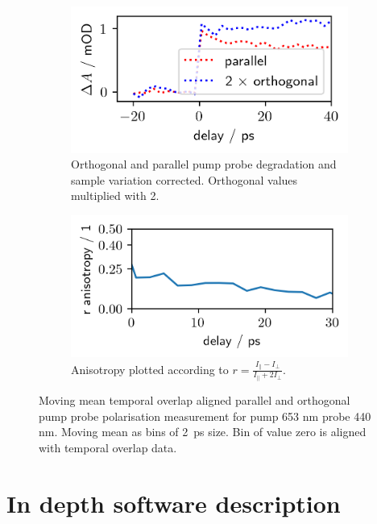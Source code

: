 \documentclass[twoside,openright]{scrreprt}
\begin{document}
\begin{figure}[hbt]
\centering
\begin{subfigure}[t]{0.49\linewidth}
\includegraphics[scale=1]{images/440nm_ParallelOrthComparison.png}
\caption{Orthogonal and parallel pump probe degradation and sample variation corrected. Orthogonal values multiplied with 2.\label{fig:polarisationComp}}
\end{subfigure}
\hfill
\begin{subfigure}[t]{0.49\linewidth}
\includegraphics[scale=1]{images/440nm_ParallelOrthComparison_anisotropy.png}
\caption{Anisotropy plotted according to $r = \frac{I_\parallel-I_\perp}{I_\parallel + 2 I_\perp}$.}
\end{subfigure}
\caption{Moving mean temporal overlap aligned parallel and orthogonal pump probe polarisation measurement for pump 653 nm probe 440 nm. Moving mean as bins of \SI{2}{\pico\second} size. Bin of value zero is aligned with temporal overlap data.\label{fig:440nmPolarisations}}
\end{figure}




\chapter{In depth software description}
\end{document}
